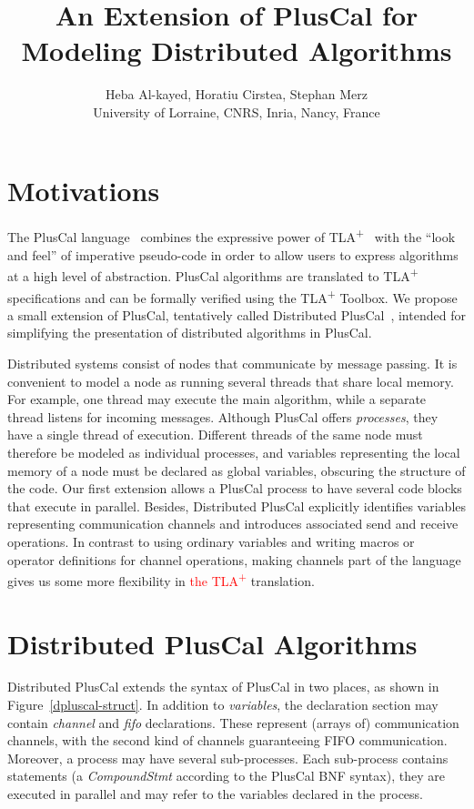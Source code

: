 \documentclass{article}
\title{An Extension of PlusCal for Modeling Distributed Algorithms}
\author{%
  Heba Al-kayed, Horatiu Cirstea, Stephan Merz\\
  University of Lorraine, CNRS, Inria, Nancy, France%
}
\date{}
\newcommand{\tlaplus}{TLA\textsuperscript{+}\xspace}
\newcommand{\textHC}[1]{{\textcolor{red}{#1}}}
\begin{document}

\maketitle


\section{Motivations}

The PlusCal language~\cite{pcalAlgo,wayne:practical} combines the expressive power of \tlaplus~\cite{tlabook} with the ``look and feel'' of imperative pseudo-code in order to allow users to express algorithms at a high level of abstraction. PlusCal algorithms are translated to \tlaplus specifications and can be formally verified using the \tlaplus Toolbox. We propose a small extension of PlusCal, tentatively called Distributed PlusCal~\cite{dpluscal}, intended for simplifying the presentation of distributed algorithms in PlusCal.

Distributed systems consist of nodes that communicate by message
passing. It is convenient to model a node as running several threads
that share local memory. For example, one thread may execute the main
algorithm, while a separate thread listens for incoming
messages. Although PlusCal offers \emph{processes}, they have a single
thread of execution. Different threads of the same node must therefore
be modeled as individual processes, and variables representing the
local memory of a node must be declared as global variables, obscuring
the structure of the code. Our first extension allows a PlusCal
process to have several code blocks that execute in parallel. Besides,
Distributed PlusCal explicitly identifies variables representing
communication channels and introduces associated send and receive
operations. In contrast to using ordinary variables and writing macros
or operator definitions for channel operations, making channels part
of the language gives us some more flexibility in \textHC{the \tlaplus}
translation. 


\section{Distributed PlusCal Algorithms}

Distributed PlusCal extends the syntax of PlusCal in two places, as shown in Figure~\ref{dpluscal-struct}. In addition to \emph{variables}, the declaration section may contain \emph{channel} and \emph{fifo} declarations. These represent (arrays of) communication channels, with the second kind of channels guaranteeing FIFO communication. Moreover, a process may have several sub-processes. Each sub-process contains statements (a \emph{CompoundStmt} according to the PlusCal BNF syntax), they are executed in parallel and may refer to the variables declared in the process.
\end{document}
